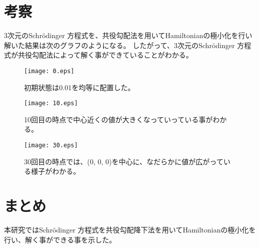 \documentclass[a4j,twocolumn]{jarticle}
\begin{document}
\vspace{-5mm}
\section{考察}
3次元のSchr\"odinger  方程式を、共役勾配法を用いてHamiltonianの極小化を行い解いた結果は次のグラフのようになる。
したがって、3次元のSchr\"odinger  方程式が共役勾配法によって解く事ができていることがわかる。
\vspace{-3.0mm}
\begin{figure}[h]
\texttt{[image: 0.eps]}
\caption{初期状態は0.01を均等に配置した。}
\end{figure}

\vspace{-3.0mm}
\begin{figure}[h]
\texttt{[image: 10.eps]}
\caption{10回目の時点で中心近くの値が大きくなっていっている事がわかる。}
\end{figure}

\vspace{-3.0mm}
\begin{figure}[h]
\texttt{[image: 30.eps]}
\caption{30回目の時点では、(0, 0, 0)を中心に、なだらかに値が広がっている様子がわかる。}
\end{figure}

\vspace{-7mm}
\section{まとめ}
本研究ではSchr\"odinger  方程式を共役勾配降下法を用いてHamiltonianの極小化を行い、解く事ができる事を示した。
\end{document}
